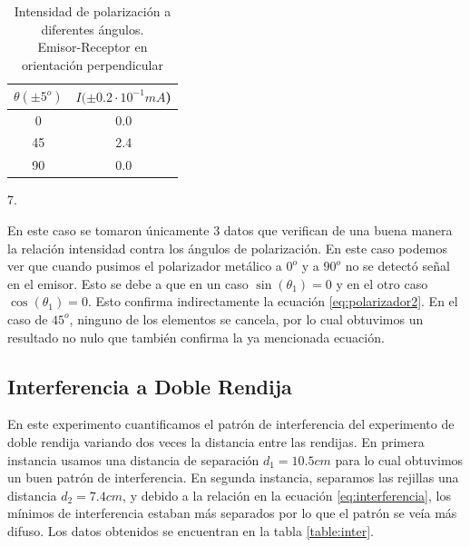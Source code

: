 \documentclass[%
 reprint,
 amsmath,amssymb,
 aps,
]{revtex4-1}
\begin{document}
\begin{table}[h!]
\centering
\begin{tabular}{|c|c|}
	\hline $ \theta (\pm 5^o) $ & $ I(\pm 0.2\cdot 10^{-1}mA  $)  \\ 
	\hline\hline
	0  &  0.0\\
	45 &  2.4\\ 
	90 &  0.0\\ 
	[1ex] 
 \hline
 \end{tabular} 
  \caption{Intensidad de polarización a diferentes ángulos.\\ Emisor-Receptor en orientación perpendicular}
\label{table:polarizador3} 7.
\end{table}

En este caso se tomaron únicamente 3 datos que verifican de una buena manera la relación intensidad contra los ángulos de polarización. En este caso podemos ver que cuando pusimos el polarizador metálico a $0^o$ y a $90^o$ no se detectó señal en el emisor. Esto se debe a que en un caso $\sin{(\theta_1) }= 0$ y en el otro caso $\cos{(\theta_1)} = 0$. Esto confirma indirectamente la ecuación \ref{eq:polarizador2}. En el caso de $45^o$, ninguno de los elementos se cancela, por lo cual obtuvimos un resultado no nulo que también confirma la ya mencionada ecuación.\\

\subsection{\label{sec:level2}Interferencia a Doble Rendija}
En este experimento cuantificamos el patrón de interferencia del experimento de doble rendija variando dos veces la distancia entre las rendijas. En primera instancia usamos una distancia de separación $d_1= 10.5cm$ para lo cual obtuvimos un buen patrón de interferencia. En segunda instancia, separamos las rejillas una distancia $d_2 = 7.4cm$, y debido a la relación en la ecuación \ref{eq:interferencia}, los mínimos de interferencia estaban más separados por lo que el patrón se veía más difuso.  Los datos obtenidos se encuentran en la tabla \ref{table:inter}.\\
\end{document}
